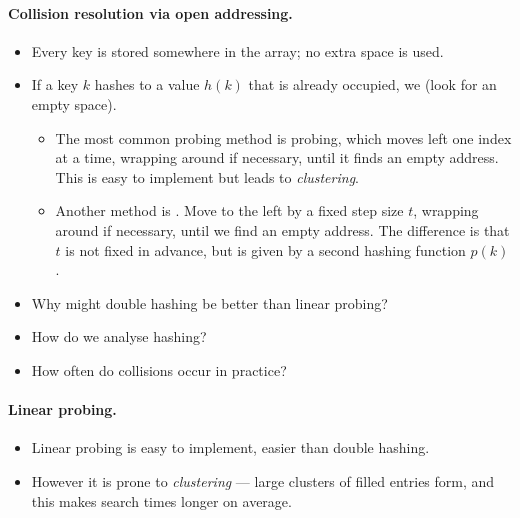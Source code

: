 \paragraph{Collision resolution via open addressing.}
\begin{itemize}
\item Every key is stored somewhere in the array; no extra space is used.
\item If a key  $k$ hashes to a value $h(k)$ that is already occupied, 
we  (look for an empty space). 
	\begin{itemize}
		\item The most common probing method is  probing, which moves left
		 one index at a time, wrapping around if necessary, until it finds an empty 
		 address. This is easy to implement but leads to \emph{clustering}.
		\item Another method is . Move to the left by a
		fixed step size $t$, wrapping around if necessary, until we find an
		empty address. The difference is that $t$ is not fixed in advance, but
		is given by a second hashing function $p(k)$.
	\end{itemize}
\end{itemize}

\begin{itemize}
\item Why might double hashing be better than linear probing?
\item How do we analyse hashing?
\item How often do collisions occur in practice?
\end{itemize}

\paragraph{Linear probing.}
\begin{itemize}
\item Linear probing is easy to implement, easier than double hashing.
\item However it is prone to \emph{clustering} --- large clusters of filled entries form, and this makes search times longer on average.
\end{itemize}


